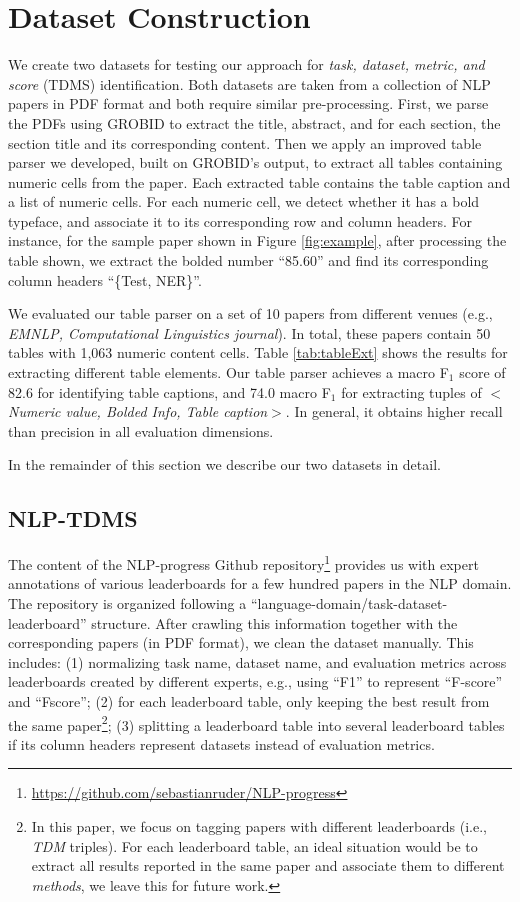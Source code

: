 \documentclass[11pt,a4paper]{article}
\begin{document}
\section{Dataset Construction}
\label{sec:datasets}


We create two datasets for testing our approach for \emph{task, dataset, metric, and score} (TDMS) identification.
Both datasets are taken from a collection of NLP papers in PDF format and both require similar pre-processing.
First, we parse the PDFs using GROBID \cite{gorbid} to extract the title, abstract, and for each section, the section title and its corresponding content. 
Then we apply an improved table parser we developed, built on GROBID's output, to extract all tables containing numeric cells from the paper.
Each extracted table contains the table caption and a list of numeric cells. For each numeric cell, we detect whether it has a bold typeface, and associate it to its corresponding row and column headers. For instance, for the sample paper shown in Figure \ref{fig:example}, after processing the table shown, we extract the bolded number ``85.60'' and find its corresponding column headers ``\{Test, NER\}''.

We evaluated our table parser on a set of 10 papers from different venues (e.g., \emph{EMNLP, Computational Linguistics journal}).
In total, these papers contain 50 tables with 1,063 numeric content cells. Table \ref{tab:tableExt} shows the results for extracting different table elements.  Our table parser achieves a macro F$_1$ score of 82.6 for identifying table captions, and 74.0 macro F$_1$  for extracting tuples of $<$\emph{Numeric value, Bolded Info, Table caption}$>$. In general, it obtains higher recall than precision in all evaluation dimensions.

In the remainder of this section we describe our two datasets in
detail.




\subsection{NLP-TDMS}
\label{sec:ds1}
The content of the NLP-progress Github repository\footnote{\url{https://github.com/sebastianruder/NLP-progress}} provides us with expert annotations of various leaderboards for a few hundred papers in the NLP domain. The repository is organized following a ``language-domain/task-dataset-leaderboard'' structure. After crawling this information together with the corresponding papers (in PDF format), we clean the dataset manually. This includes: (1) normalizing task name, dataset name, and evaluation metrics across  leaderboards created by different experts, e.g., using ``F1'' to represent ``F-score'' and ``Fscore''; (2) for each leaderboard table, only keeping the best result from the same paper\footnote{In this paper, we focus on tagging papers with different leaderboards (i.e., \emph{TDM} triples). For each leaderboard table, an ideal situation would be to extract all results reported in the same paper and associate them to different \emph{methods}, we leave this for future work.}; (3) splitting a leaderboard table into several leaderboard tables 
if its column headers represent datasets instead of evaluation metrics. 
\end{document}

